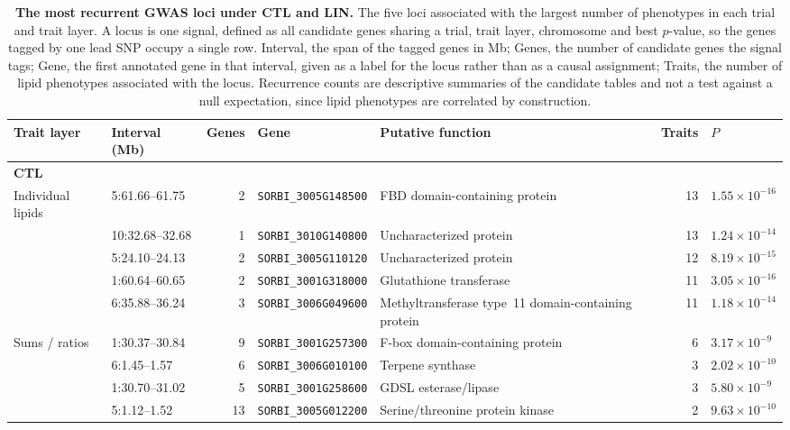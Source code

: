 \documentclass[9pt,twocolumn,twoside]{rilabRxiv}
\begin{document}
\begin{table}[!ht]
\centering
\caption{\textbf{The most recurrent GWAS loci under CTL and LIN.} The five loci associated with the largest number of phenotypes in each trial and trait layer. A locus is one signal, defined as all candidate genes sharing a trial, trait layer, chromosome and best $p$-value, so the genes tagged by one lead SNP occupy a single row. Interval, the span of the tagged genes in Mb; Genes, the number of candidate genes the signal tags; Gene, the first annotated gene in that interval, given as a label for the locus rather than as a causal assignment; Traits, the number of lipid phenotypes associated with the locus. Recurrence counts are descriptive summaries of the candidate tables and not a test against a null expectation, since lipid phenotypes are correlated by construction.}
\label{tab:top_loci}
\scriptsize
\begin{tabular}{llrllrl}
\toprule
\textbf{Trait layer} & \textbf{Interval (Mb)} & \textbf{Genes} & \textbf{Gene} & \textbf{Putative function} & \textbf{Traits} & \textbf{$P$} \\
\midrule
\multicolumn{7}{l}{\textbf{CTL}} \\
Individual lipids & 5:61.66--61.75 & 2 & \texttt{SORBI\_3005G148500} & FBD domain-containing protein & 13 & $1.55\times10^{-16}$ \\
 & 10:32.68--32.68 & 1 & \texttt{SORBI\_3010G140800} & Uncharacterized protein & 13 & $1.24\times10^{-14}$ \\
 & 5:24.10--24.13 & 2 & \texttt{SORBI\_3005G110120} & Uncharacterized protein & 12 & $8.19\times10^{-15}$ \\
 & 1:60.64--60.65 & 2 & \texttt{SORBI\_3001G318000} & Glutathione transferase & 11 & $3.05\times10^{-16}$ \\
 & 6:35.88--36.24 & 3 & \texttt{SORBI\_3006G049600} & Methyltransferase type~11 domain-containing protein & 11 & $1.18\times10^{-14}$ \\
\addlinespace
Sums / ratios & 1:30.37--30.84 & 9 & \texttt{SORBI\_3001G257300} & F-box domain-containing protein & 6 & $3.17\times10^{-9}$ \\
 & 6:1.45--1.57 & 6 & \texttt{SORBI\_3006G010100} & Terpene synthase & 3 & $2.02\times10^{-10}$ \\
 & 1:30.70--31.02 & 5 & \texttt{SORBI\_3001G258600} & GDSL esterase/lipase & 3 & $5.80\times10^{-9}$ \\
 & 5:1.12--1.52 & 13 & \texttt{SORBI\_3005G012200} & Serine/threonine protein kinase & 2 & $9.63\times10^{-10}$ \\

\end{tabular}
\end{table}
\end{document}

